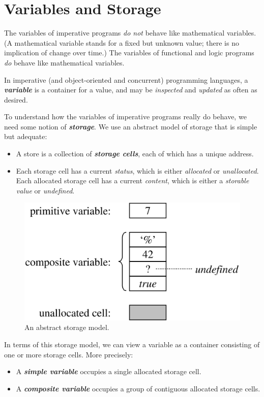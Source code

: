 \section{Variables and Storage}

The variables of imperative programs \textit{do not} behave like mathematical variables. (A mathematical variable stands for a fixed but unknown value; there is no implication of change over time.) The variables of functional and logic programs \textit{do} behave like mathematical variables.

In imperative (and object-oriented and concurrent) programming languages, a \textit{\textbf{variable}} is a container for a value, and may be \textit{inspected} and \textit{updated} as often as desired.

To understand how the variables of imperative programs really do behave, we need some notion of \textit{\textbf{storage}}. We use an abstract model of storage that is simple but adequate:
\begin{itemize}
  \item A store is a collection of \textit{\textbf{storage cells}}, each of which has a unique address.
  \item Each storage cell has a current \textit{status}, which is either \textit{allocated} or \textit{unallocated}. Each allocated storage cell has a current \textit{content}, which is either a \textit{storable value} or \textit{undefined}.
\end{itemize}

\begin{figure}[H]
  \centering
  \includegraphics[width=.8\linewidth]{img/fig-3.1.png}
  \caption{An abstract storage model.}
\end{figure}

In terms of this storage model, we can view a variable as a container consisting of one or more storage cells. More precisely:
\begin{itemize}
  \item A \textit{\textbf{simple variable}} occupies a single allocated storage cell.
  \item A \textit{\textbf{composite variable}} occupies a group of contiguous allocated storage cells.
\end{itemize}

